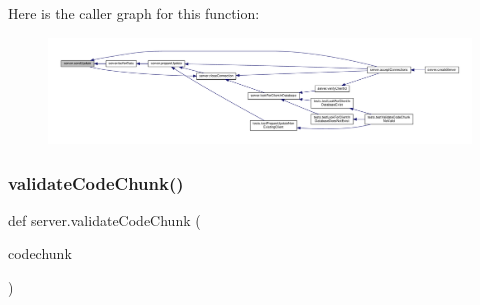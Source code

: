 Here is the caller graph for this function\+:
\nopagebreak
\begin{figure}[H]
\begin{center}
\leavevmode
\includegraphics[width=350pt]{namespaceserver_a4889d0db3f3503cc61340252fabc2c24_icgraph}
\end{center}
\end{figure}
\mbox{\label{namespaceserver_ad6f5a9a8c8e233d0537dc69dc6de98f6}} 
\subsubsection{\texorpdfstring{validate\+Code\+Chunk()}{validateCodeChunk()}}
{\footnotesize\ttfamily def server.\+validate\+Code\+Chunk (\begin{DoxyParamCaption}\item[{}]{codechunk }\end{DoxyParamCaption})}


